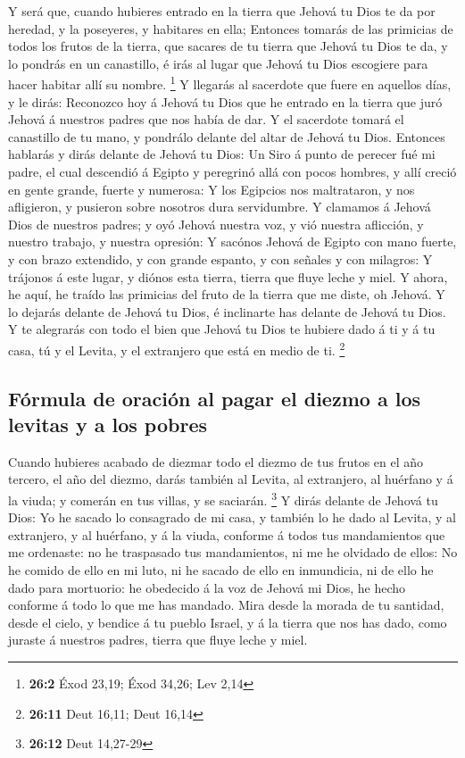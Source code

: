  Y será que, cuando hubieres entrado en la tierra que
Jehová tu Dios te da por heredad, y la poseyeres, y habitares en ella;
 Entonces tomarás de las primicias de todos los frutos de
la tierra, que sacares de tu tierra que Jehová tu Dios te da, y lo
pondrás en un canastillo, é irás al lugar que Jehová tu Dios escogiere
para hacer habitar allí su nombre. \footnote{\textbf{26:2} Éxod 23,19;
  Éxod 34,26; Lev 2,14}  Y llegarás al sacerdote que fuere
en aquellos días, y le dirás: Reconozco hoy á Jehová tu Dios que he
entrado en la tierra que juró Jehová á nuestros padres que nos había de
dar.  Y el sacerdote tomará el canastillo de tu mano, y
pondrálo delante del altar de Jehová tu Dios.  Entonces
hablarás y dirás delante de Jehová tu Dios: Un Siro á punto de perecer
fué mi padre, el cual descendió á Egipto y peregrinó allá con pocos
hombres, y allí creció en gente grande, fuerte y numerosa:
 Y los Egipcios nos maltrataron, y nos afligieron, y
pusieron sobre nosotros dura servidumbre.  Y clamamos á
Jehová Dios de nuestros padres; y oyó Jehová nuestra voz, y vió nuestra
aflicción, y nuestro trabajo, y nuestra opresión:  Y
sacónos Jehová de Egipto con mano fuerte, y con brazo extendido, y con
grande espanto, y con señales y con milagros:  Y trájonos
á este lugar, y diónos esta tierra, tierra que fluye leche y miel.
 Y ahora, he aquí, he traído las primicias del fruto de
la tierra que me diste, oh Jehová. Y lo dejarás delante de Jehová tu
Dios, é inclinarte has delante de Jehová tu Dios.  Y te
alegrarás con todo el bien que Jehová tu Dios te hubiere dado á ti y á
tu casa, tú y el Levita, y el extranjero que está en medio de ti.
\footnote{\textbf{26:11} Deut 16,11; Deut 16,14}

\hypertarget{fuxf3rmula-de-oraciuxf3n-al-pagar-el-diezmo-a-los-levitas-y-a-los-pobres}{%
\subsection{Fórmula de oración al pagar el diezmo a los levitas y a los
pobres}\label{fuxf3rmula-de-oraciuxf3n-al-pagar-el-diezmo-a-los-levitas-y-a-los-pobres}}

 Cuando hubieres acabado de diezmar todo el diezmo de tus
frutos en el año tercero, el año del diezmo, darás también al Levita, al
extranjero, al huérfano y á la viuda; y comerán en tus villas, y se
saciarán. \footnote{\textbf{26:12} Deut 14,27-29}  Y
dirás delante de Jehová tu Dios: Yo he sacado lo consagrado de mi casa,
y también lo he dado al Levita, y al extranjero, y al huérfano, y á la
viuda, conforme á todos tus mandamientos que me ordenaste: no he
traspasado tus mandamientos, ni me he olvidado de ellos: 
No he comido de ello en mi luto, ni he sacado de ello en inmundicia, ni
de ello he dado para mortuorio: he obedecido á la voz de Jehová mi Dios,
he hecho conforme á todo lo que me has mandado.  Mira
desde la morada de tu santidad, desde el cielo, y bendice á tu pueblo
Israel, y á la tierra que nos has dado, como juraste á nuestros padres,
tierra que fluye leche y miel.

